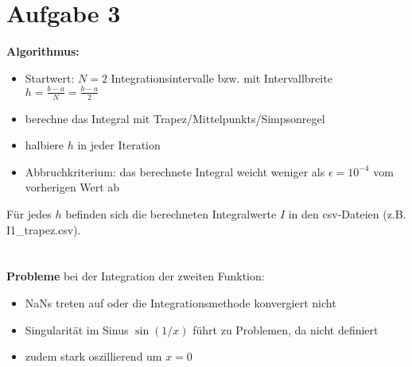 \section{Aufgabe 3}
\label{sec:A3}
\textbf{Algorithmus:}
\begin{itemize}
    \item Startwert: $N=2$ Integrationsintervalle bzw. mit Intervallbreite $h = \frac{b-a}{N} = \frac{b-a}{2}$
    \item berechne das Integral mit Trapez/Mittelpunkts/Simpsonregel
    \item halbiere $h$ in jeder Iteration
    \item Abbruchkriterium: das berechnete Integral weicht weniger als $\epsilon=10^{-4}$ vom vorherigen Wert ab
\end{itemize}

Für jedes $h$ befinden sich die berechneten Integralwerte $I$ in den csv-Dateien (z.B. I1\_trapez.csv).
\\
\\
\\
\textbf{Probleme} bei der Integration der zweiten Funktion:
\begin{itemize}
    \item NaNs treten auf oder die Integrationsmethode konvergiert nicht
    \item Singularität im Sinus $\sin(1/x)$ führt zu Problemen, da nicht definiert
    \item zudem stark oszillierend um $x=0$
\end{itemize}